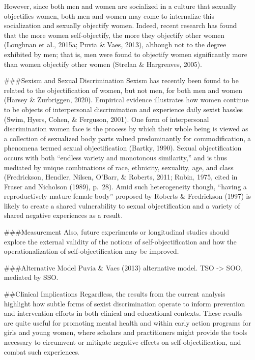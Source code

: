 \documentclass[
  man]{apa6}
\begin{document}
However, since both men and women are socialized in a culture that sexually objectifies women, both men and women may come to internalize this socialization and sexually objectify women. Indeed, recent research has found that the more women self-objectify, the more they objectify other women (Loughnan et al., 2015a; Puvia \& Vaes, 2013), although not to the degree exhibited by men; that is, men were found to objectify women significantly more than women objectify other women (Strelan \& Hargreaves, 2005).

\#\#\#Sexism and Sexual Discrimination
Sexism has recently been found to be related to the objectification of women, but not men, for both men and women (Harsey \& Zurbriggen, 2020). Empirical evidence illustrates how women continue to be objects of interpersonal discrimination and experience daily sexist hassles (Swim, Hyers, Cohen, \& Ferguson, 2001). One form of interpersonal discrimination women face is the process by which their whole being is viewed as a collection of sexualized body parts valued predominantly for commodification, a phenomena termed sexual objectification (Bartky, 1990). Sexual objectification occurs with both \enquote{endless variety and monotonous similarity,} and is thus mediated by unique combinations of race, ethnicity, sexuality, age, and class (Fredrickson, Hendler, Nilsen, O'Barr, \& Roberts, 2011; Rubin, 1975, cited in Fraser and Nicholson (1989), p.~28). Amid such heterogeneity though, \enquote{having a reproductively mature female body} proposed by Roberts \& Fredrickson (1997) is likely to create a shared vulnerability to sexual objectification and a variety of shared negative experiences as a result.

\#\#\#Measurement
Also, future experiments or longitudinal studies should explore the external validity of the notions of self-objectification and how the operationalization of self-objectification may be improved.

\#\#\#Alternative Model
Puvia \& Vaes (2013) alternative model. TSO -\textgreater{} SOO, mediated by SSO.

\#\#Clinical Implications
Regardless, the results from the current analysis highlight how subtle forms of sexist discrimination operate to inform prevention and intervention efforts in both clinical and educational contexts. These results are quite useful for promoting mental health and within early action programs for girls and young women, where scholars and practitioners might provide the tools necessary to circumvent or mitigate negative effects on self-objectification, and combat such experiences.
\end{document}
